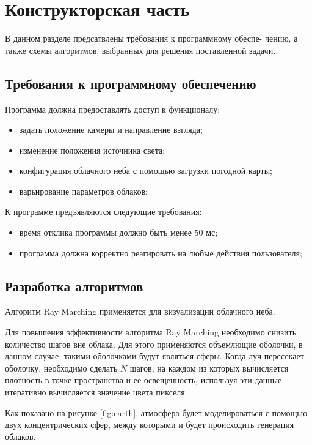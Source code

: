 \chapter{Конструкторская часть}

В данном разделе предсатвлены требования к программному обеспе-
чению, а также схемы алгоритмов, выбранных для решения поставленной
задачи.

\section{Требования к программному обеспечению}
Программа должна предоставлять доступ к функционалу:
\begin{itemize}
	\item задать положение камеры и направление взгляда;
	\item изменение положения источника света;
	\item конфигурация облачного неба с помощью загрузки погодной карты;
	\item варьирование параметров облаков;
\end{itemize}

К программе предъявляются следующие требования:
\begin{itemize}
	\item время отклика программы должно быть менее 50 мс;
	\item программа должна корректно реагировать на любые действия пользователя;
\end{itemize}

\section{Разработка алгоритмов}

Алгоритм Ray Marching применяется для визуализации облачного неба. 

Для повышения эффективности алгоритма Ray Marching необходимо снизить количество шагов вне облака. Для этого применяются объемлющие оболочки, в данном случае, такими оболочками будут являться сферы. Когда луч пересекает оболочку, необходимо сделать $ N $ шагов, на каждом из которых вычисляется плотность в точке пространства и ее освещенность, используя эти данные итеративно вычисляется значение цвета пикселя. 

Как показано на рисунке \ref{fig:earth}, атмосфера будет моделироваться с помощью двух концентрических сфер, между которыми и будет происходить генерация облаков.

